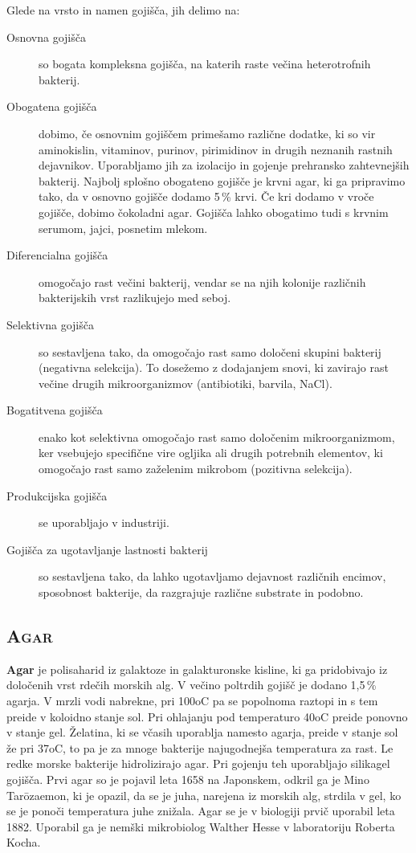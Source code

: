 \documentclass[12pt, a4paper]{report}
\begin{document}
Glede na vrsto in namen gojišča, jih delimo na:
\begin{description}
\item[Osnovna gojišča] so bogata kompleksna gojišča, na katerih raste večina heterotrofnih bakterij.
\item[Obogatena gojišča] dobimo, če osnovnim gojiščem primešamo različne dodatke, ki so vir aminokislin, vitaminov, purinov, pirimidinov in drugih neznanih rastnih dejavnikov. Uporabljamo jih za izolacijo in gojenje prehransko zahtevnejših bakterij. Najbolj splošno obogateno gojišče je krvni agar, ki ga pripravimo tako, da v osnovno gojišče dodamo 5\,\% krvi. Če kri dodamo v vroče gojišče, dobimo čokoladni agar. Gojišča lahko obogatimo tudi s krvnim serumom, jajci, posnetim mlekom.
\item[Diferencialna gojišča] omogočajo rast večini bakterij, vendar se na njih kolonije različnih bakterijskih vrst razlikujejo med seboj.
\item[Selektivna gojišča] so sestavljena tako, da omogočajo rast samo določeni skupini bakterij (negativna selekcija). To dosežemo z dodajanjem snovi, ki zavirajo rast večine drugih mikroorganizmov (antibiotiki, barvila, NaCl).
\item[Bogatitvena gojišča] enako kot selektivna omogočajo rast samo določenim mikroorganizmom, ker vsebujejo specifične vire ogljika ali drugih potrebnih elementov, ki omogočajo rast samo zaželenim mikrobom (pozitivna selekcija).
\item[Produkcijska gojišča] se uporabljajo v industriji.
\item[Gojišča za ugotavljanje lastnosti bakterij] so sestavljena tako, da lahko ugotavljamo dejavnost različnih encimov, sposobnost bakterije, da razgrajuje različne substrate in podobno.
\end{description}

\subsection{\textsc{Agar}}

\textbf{Agar} je polisaharid iz galaktoze in galakturonske kisline, ki ga pridobivajo iz določenih vrst rdečih morskih alg. V večino poltrdih gojišč je dodano 1,5\,\% agarja. V mrzli vodi nabrekne, pri 100oC pa se popolnoma raztopi in s tem preide v koloidno stanje sol. Pri ohlajanju pod temperaturo 40oC preide ponovno v stanje gel. Želatina, ki se včasih uporablja namesto agarja, preide v stanje sol že pri 37oC, to pa je za mnoge bakterije najugodnejša temperatura za rast. Le redke morske bakterije hidrolizirajo agar. Pri gojenju teh uporabljajo silikagel gojišča. Prvi agar so je pojavil leta 1658 na Japonskem, odkril ga je Mino Tarōzaemon, ki je opazil, da se je juha, narejena iz morskih alg, strdila v gel, ko se je ponoči temperatura juhe znižala. Agar se je v biologiji prvič uporabil leta 1882. Uporabil ga je nemški mikrobiolog Walther Hesse v laboratoriju Roberta Kocha.
\end{document}

